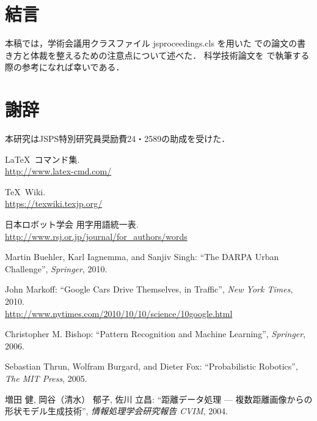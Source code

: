 \documentclass[uplatex, twocolumn, 9pt]{jsproceedings}
\begin{document}
\section{結言}
本稿では，学術会議用クラスファイル jsproceedings.cls を用いた \LaTeXe での論文の書き方と体裁を整えるための注意点について述べた．
科学技術論文を \LaTeXe で執筆する際の参考になれば幸いである．

\section*{謝辞}
本研究はJSPS特別研究員奨励費24・2589の助成を受けた．

\footnotesize
\begin{thebibliography}{99}
\LaTeX~コマンド集.\\
\url{http://www.latex-cmd.com/}

\TeX~Wiki.\\
\url{https://texwiki.texjp.org/}

日本ロボット学会 用字用語統一表.\\
\url{http://www.rsj.or.jp/journal/for_authors/words}


Martin Buehler, Karl Iagnemma, and Sanjiv Singh: ``The DARPA Urban Challenge'', \textit{Springer}, 2010.

John Markoff: ``Google Cars Drive Themselves, in Traffic'', \textit{New York Times}, 2010.\\
\url{http://www.nytimes.com/2010/10/10/science/10google.html}

Christopher M. Bishop: ``Pattern Recognition and Machine Learning'', \textit{Springer}, 2006.


Sebastian Thrun, Wolfram Burgard, and Dieter Fox: ``Probabilistic Robotics'', \textit{The MIT Press}, 2005.


増田 健, 岡谷（清水） 郁子, 佐川 立昌: ``距離データ処理 --- 複数距離画像からの形状モデル生成技術'', \textit{情報処理学会研究報告 CVIM}, 2004.


\end{thebibliography}
\end{document}
